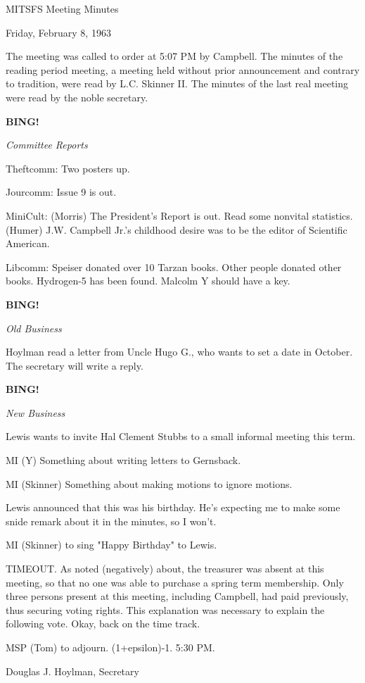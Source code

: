 \documentclass[12pt]{article}
\newcommand{\bing}{{\bf BING!} }
\newcommand{\goto}[1]{\bing \vskip 12pt \centerline{{\em{#1}}}}
\begin{document}
\begin{center}

MITSFS Meeting Minutes

Friday, February 8, 1963

\end{center}
 
\vspace{12pt}

\setlength{\parskip}{6pt}

\noindent
The meeting was called to order at 5:07 PM by Campbell. The minutes of the reading period meeting, a meeting held without prior announcement and contrary to tradition, were read by L.C. Skinner II. The minutes of the last real meeting were read by the noble secretary.

\goto{Committee Reports}

Theftcomm: Two posters up.

Jourcomm: Issue 9 is out.

MiniCult: (Morris) The President's Report is out. Read some nonvital statistics. (Humer) J.W. Campbell Jr.'s childhood desire was to be the editor of Scientific American.

Libcomm: Speiser donated over 10 Tarzan books. Other people donated other books. Hydrogen-5 has been found. Malcolm Y should have a key.

\goto{Old Business}

Hoylman read a letter from Uncle Hugo G., who wants to set a date in October. The secretary will write a reply.

\goto{New Business}

Lewis wants to invite Hal Clement Stubbs to a small informal meeting this term.

MI (Y) Something about writing letters to Gernsback.

MI (Skinner) Something about making motions to ignore motions.

Lewis announced that this was his birthday. He's expecting me to make some snide remark about it in the minutes, so I won't.

MI (Skinner) to sing "Happy Birthday" to Lewis.

TIMEOUT. As noted (negatively) about, the treasurer was absent at this meeting, so that no one was able to purchase a spring term membership. Only three persons present at this meeting, including Campbell, had paid previously, thus securing voting rights. This explanation was necessary to explain the following vote. Okay, back on the time track.

MSP (Tom) to adjourn. (1+epsilon)-1. 5:30 PM.

\vspace{12pt}

\centerline{Douglas J. Hoylman, Secretary}
\end{document}
